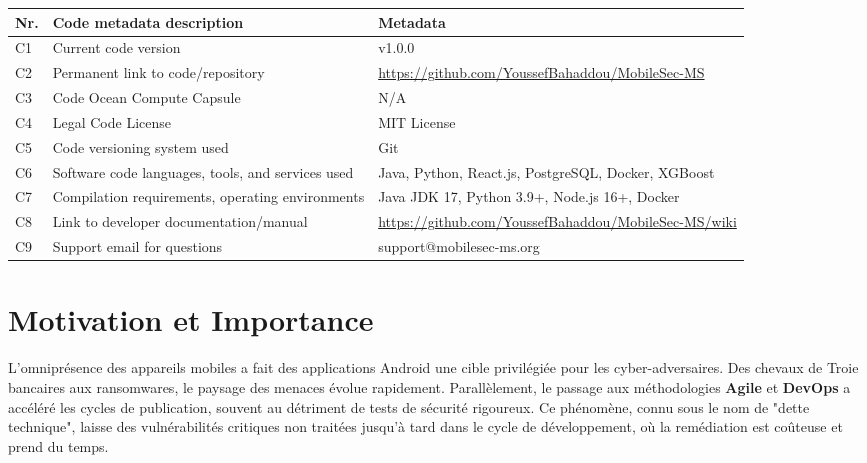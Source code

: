 \documentclass[
  journal=largetwo,
  manuscript=article-type,
  year=2025,
  volume=1,
]{cup-journal}
\begin{document}
\begin{strip}
\centering
{}
\label{tab-metadata}
\begin{tabular}{p{1cm} p{6cm} p{9cm}}
\toprule
\textbf{Nr.} & \textbf{Code metadata description} & \textbf{Metadata} \\
\midrule
C1 & Current code version & v1.0.0 \\
C2 & Permanent link to code/repository & \url{https://github.com/YoussefBahaddou/MobileSec-MS} \\
C3 & Code Ocean Compute Capsule & N/A \\
C4 & Legal Code License & MIT License \\
C5 & Code versioning system used & Git \\
C6 & Software code languages, tools, and services used & Java, Python, React.js, PostgreSQL, Docker, XGBoost \\
C7 & Compilation requirements, operating environments & Java JDK 17, Python 3.9+, Node.js 16+, Docker \\
C8 & Link to developer documentation/manual & \url{https://github.com/YoussefBahaddou/MobileSec-MS/wiki} \\
C9 & Support email for questions & support@mobilesec-ms.org \\
\bottomrule
\end{tabular}
\end{strip}

\section{Motivation et Importance}
\label{sec-motivation}

L'omniprésence des appareils mobiles a fait des applications Android une cible privilégiée pour les cyber-adversaires. Des chevaux de Troie bancaires aux ransomwares, le paysage des menaces évolue rapidement. Parallèlement, le passage aux méthodologies \textbf{Agile} et \textbf{DevOps} a accéléré les cycles de publication, souvent au détriment de tests de sécurité rigoureux. Ce phénomène, connu sous le nom de "dette technique", laisse des vulnérabilités critiques non traitées jusqu'à tard dans le cycle de développement, où la remédiation est coûteuse et prend du temps.
\end{document}
